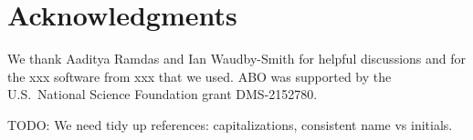 \documentclass{article}
\newcommand{\art}[1]{\begingroup\color{blue}#1\endgroup}
\newcommand{\fred}[1]{\begingroup\color{red}#1\endgroup}
\begin{document}

\section*{Acknowledgments}

We thank Aaditya Ramdas and Ian Waudby-Smith for helpful
discussions and for the \art{xxx} software
from \art{xxx} that we used.
ABO was supported by the U.S.\ National Science Foundation
grant DMS-2152780.

\art{TODO: We need tidy up references: capitalizations,
consistent name vs initials.}



\end{document}
